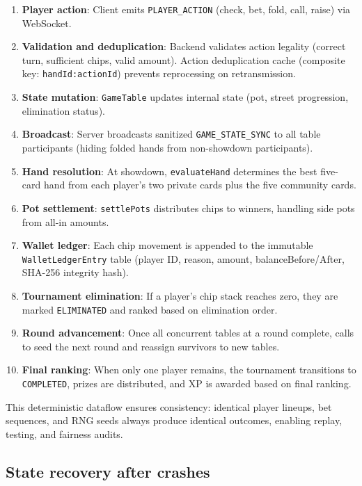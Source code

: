 \documentclass[11pt,a4paper]{article}
\begin{document}
\begin{enumerate}
\item \textbf{Player action}: Client emits \texttt{PLAYER\_ACTION} (check, bet, fold, call, raise) via WebSocket.
\item \textbf{Validation and deduplication}: Backend validates action legality (correct turn, sufficient chips, valid amount). Action deduplication cache (composite key: \texttt{handId:actionId}) prevents reprocessing on retransmission.
\item \textbf{State mutation}: \texttt{GameTable} updates internal state (pot, street progression, elimination status).
\item \textbf{Broadcast}: Server broadcasts sanitized \texttt{GAME\_STATE\_SYNC} to all table participants (hiding folded hands from non-showdown participants).
\item \textbf{Hand resolution}: At showdown, \texttt{evaluateHand} determines the best five-card hand from each player's two private cards plus the five community cards.
\item \textbf{Pot settlement}: \texttt{settlePots} distributes chips to winners, handling side pots from all-in amounts.
\item \textbf{Wallet ledger}: Each chip movement is appended to the immutable \texttt{WalletLedgerEntry} table (player ID, reason, amount, balanceBefore/After, SHA-256 integrity hash).
\item \textbf{Tournament elimination}: If a player's chip stack reaches zero, they are marked \texttt{ELIMINATED} and ranked based on elimination order.
\item \textbf{Round advancement}: Once all concurrent tables at a round complete,  calls  to seed the next round and reassign survivors to new tables.
\item \textbf{Final ranking}: When only one player remains, the tournament transitions to \texttt{COMPLETED}, prizes are distributed, and XP is awarded based on final ranking.
\end{enumerate}

This deterministic dataflow ensures consistency: identical player lineups, bet sequences, and RNG seeds always produce identical outcomes, enabling replay, testing, and fairness audits.

\subsection{State recovery after crashes}
\end{document}
